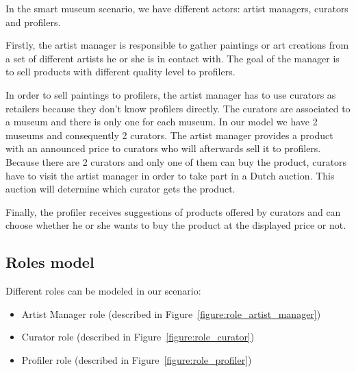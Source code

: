 \documentclass[a4paper,11pt]{report}
\begin{document}
  In the smart museum scenario, we have different actors: artist managers, curators 
  and profilers.
  
  Firstly, the artist manager is responsible to gather paintings or art creations 
  from a set of different artists he or she is in contact with. The goal of the manager 
  is to sell products with different quality level to profilers.
  
  In order to sell paintings to profilers, the artist manager has to use curators as retailers 
  because they don't know profilers directly. The curators are associated to a museum and there
  is only one for each museum. In our model we have 2 museums and consequently 2 curators. The artist manager 
  provides a product with an announced price to curators who will afterwards
  sell it to profilers. Because there are 2 curators and only one of them can buy 
  the product, curators have to visit the artist manager in order to take part in a Dutch auction. 
  This auction will determine which curator gets the product.
  
  Finally, the profiler receives suggestions of products offered by curators and can choose whether he or 
  she wants to buy the product at the displayed price or not.
  
  
  \subsection{Roles model}
  
  Different roles can be modeled in our scenario:
  \begin{itemize}
   \item Artist Manager role (described in Figure~\ref{figure:role_artist_manager})
   \item Curator role (described in Figure~\ref{figure:role_curator})
   \item Profiler role (described in Figure~\ref{figure:role_profiler})
  \end{itemize}
\end{document}
